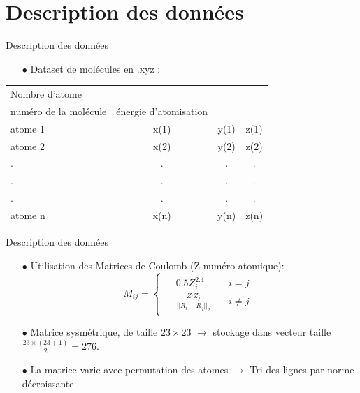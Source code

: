 \documentclass{beamer}
\begin{document}
\section{Description des données}
\begin{frame}{Description des données}
\begin{itemize}
\item[$\bullet$] Dataset de molécules en .xyz :
\end{itemize}
\begin{tabular}{ l c c c }
   Nombre d'atome &  & & \quad\\
   numéro de la molécule &\quad énergie d'atomisation &\quad &\\
   atome 1 & x(1) & y(1) & \quad z(1) \\
   atome 2 & x(2) & y(2) & \quad z(2) \\
   . & . & . & \quad . \\
   . & . & . & \quad . \\
   . & . & . & \quad . \\
   atome n & x(n) & y(n) &\quad  z(n) \\
 \end{tabular}
\end{frame}
\begin{frame}{Description des données}
\begin{itemize}
\item[$\bullet$] Utilisation des Matrices de Coulomb (Z numéro atomique):
\[
M_{ij} = 
	\left\{
	\begin{array}{ccc}		
	\begin{aligned}
		& 0.5 Z_{i}^{2.4} \quad &i=j\\
		& \frac{Z_i Z_j}{||R_i - R_j||_{2}} \quad &i\neq j
	\end{aligned}
\end{array}
	\right.
\]
\item[$\bullet$] Matrice sysmétrique, de taille $23\times23$ $\rightarrow$ stockage dans vecteur taille $\frac{23\times(23+1)}{2} = 276$.
\item[$\bullet$] La matrice varie avec permutation des atomes $\rightarrow$ Tri des lignes par norme décroissante
\end{itemize}
\end{frame}
\end{document}
